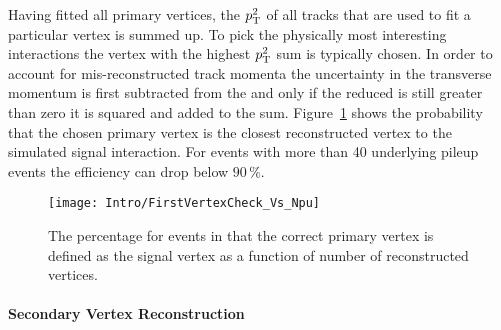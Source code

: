 Having fitted all primary vertices, the $p_{\mathrm{T}}^{2}$ of all tracks that are used to fit a particular vertex is summed up. To pick the physically most interesting interactions the vertex with the highest $p_{\mathrm{T}}^{2}$ sum is typically chosen. In order to account for mis-reconstructed track momenta the uncertainty in the transverse momentum is first subtracted from the \pt and only if the reduced \pt is still greater than zero it is squared and added to the sum. Figure~\ref{plot:IntroSigVertexProb} shows the probability that the chosen primary vertex is the closest reconstructed vertex to the simulated signal interaction. For events with more than 40 underlying pileup events the efficiency can drop below $90\,{}\%{}$.

\begin{figure}[Htb]
    \centering
    \texttt{[image: Intro/FirstVertexCheck\_Vs\_Npu]}
    \caption[Probability to define the correct vertex as signal]{The percentage for events in that the correct primary vertex is defined as the signal vertex as a function of number of reconstructed vertices. \label{plot:IntroSigVertexProb}}
\end{figure}

\paragraph*{Secondary Vertex Reconstruction \label{sec:LHCCMSSecVtx}}

